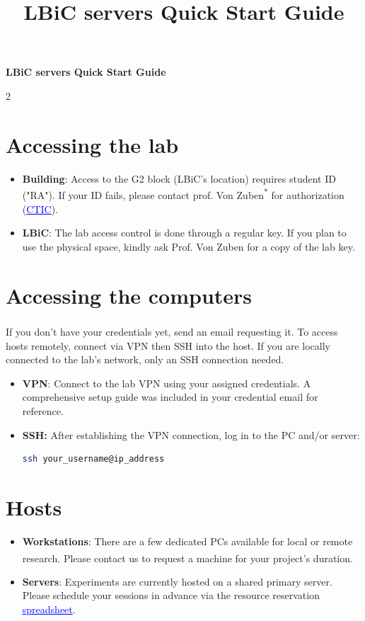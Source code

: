 \documentclass[a4paper, landscape]{article}
\date{}
\title{LBiC servers Quick Start Guide}
\begin{document}
\begin{center}
\vspace*{0cm}
{\LARGE \bfseries LBiC servers Quick Start Guide}
\end{center}
\vspace{0cm}

\begin{multicols}{2}
\raggedcolumns
\section*{Accessing the lab}
\label{sec:org9c3a035}
\begin{itemize}
\item \textbf{Building}: Access to the G2 block (LBiC's location) requires student ID ("RA"). If your ID fails, please contact prof. Von Zuben\textsuperscript{*} for authorization (\href{https://site.fee.unicamp.br/ctic/faq\detokenize{#}acesso_laboratorio}{\textcolor{blue}{\uline{CTIC}}}).
\item \textbf{LBiC}: The lab access control is done through a regular key. If you plan to use the physical space, kindly ask Prof. Von Zuben for a copy of the lab key.
\end{itemize}
\vspace{-0.5cm}
\section*{Accessing the computers}
\label{sec:org6679445}
If you don't have your credentials yet, send an email\textsuperscript{\dag}  requesting it. To access hosts remotely, connect via VPN then SSH into the host. If you are locally connected to the lab's network, only an SSH connection needed.
\begin{itemize}
\item \textbf{VPN}: Connect to the lab VPN using your assigned credentials. A comprehensive setup guide was included in your credential email for reference.
\item \textbf{SSH:} After establishing the VPN connection, log in to the PC and/or server:
\begin{lstlisting}[language=sh,numbers=none]
  ssh your_username@ip_address
\end{lstlisting}
\end{itemize}
\vspace{-0.5cm}
\section*{Hosts}
\label{sec:org02b76ee}
\begin{itemize}
\item \textbf{Workstations}: There are a few dedicated PCs available for local or remote research. Please contact us\textsuperscript{\dag} to request a machine for your project's duration.
\item \textbf{Servers}: Experiments are currently hosted on a shared primary server. Please schedule your sessions in advance via the resource reservation \href{https://docs.google.com/spreadsheets/d/1Lhi5pEze4d4Z4oHMksUpD3k6n5Hp26gXtOMGz6sXr9A/edit?usp=sharing}{\textcolor{blue}{\uline{spreadsheet}}}.
\end{itemize}


\end{multicols}
\end{document}
